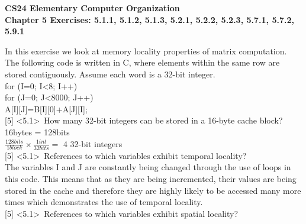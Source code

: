 \documentclass[12pt]{article}
\begin{document}
	\begin{center}
		\textbf{CS24 Elementary Computer Organization} \\
		\textbf{Chapter 5 Exercises: 5.1.1, 5.1.2, 5.1.3, 5.2.1, 5.2.2, 5.2.3, 5.7.1, 5.7.2, 5.9.1} \vspace{0.5cm}
	\end{center}
	
	\noindent {} 
	In this exercise we look at memory locality properties of matrix computation.
	The following code is written in C, where elements within the same row are stored
	contiguously. Assume each word is a 32-bit integer. \vspace{0.3cm} \\
	
	
		
		\noindent for (I=0; I<8; I++)  \\
		\indent for (J=0; J<8000; J++)  \\
		\indent \indent A[I][J]=B[I][0]+A[J][I];  \\
		

	
	\noindent {} 
	[5] \textless5.1\textgreater \ How many 32-bit integers can be stored in a 16-byte cache block? \\
	
	
	\vspace{0.2cm}
	\noindent 16bytes = 128bits  \vspace{0.1cm}\\
	$\frac{128bits}{1block} \times \frac{1int}{32bits} =$ 4 32-bit integers \vspace{0.8cm} \\
	
	
	\noindent {} 
	[5] \textless5.1\textgreater \ References to which variables exhibit temporal locality? \\
	
	\vspace{0.2cm}
	\noindent The variables I and J are constantly being changed through the use of loops in this code. This means that as they are being incremented, their values are being stored in the cache and therefore they are highly likely to be accessed many more times which demonstrates the use of temporal locality. \vspace{0.8cm} \\
	
	\noindent {} 
	[5] \textless5.1\textgreater \ References to which variables exhibit spatial locality? \\
	
\end{document}
